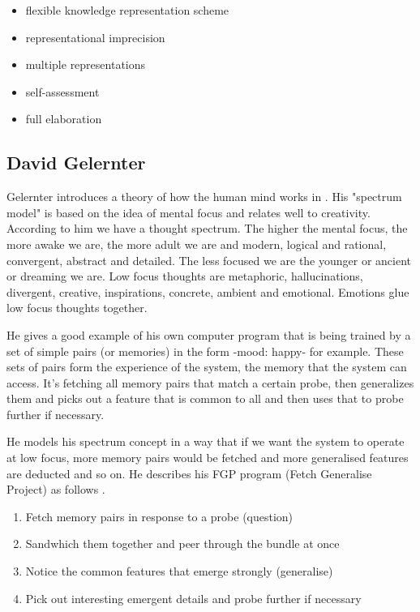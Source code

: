 \begin{itemize}
  \item flexible knowledge representation scheme
  \item representational imprecision
  \item multiple representations
  \item self-assessment
  \item full elaboration
\end{itemize}

\subsection{David Gelernter}

Gelernter introduces a theory of how the human mind works in \citep{Gelernter1994}. His "spectrum model" is based on the idea of mental focus and relates well to creativity. According to him we have a thought spectrum. The higher the mental focus, the more awake we are, the more adult we are and modern, logical and rational, convergent, abstract and detailed. The less focused we are the younger or ancient or dreaming we are. Low focus thoughts are metaphoric, hallucinations, divergent, creative, inspirations, concrete, ambient and emotional. Emotions glue low focus thoughts together.

He gives a good example of his own computer program that is being trained by a set of simple pairs (or memories) in the form -mood: happy- for example. These sets of pairs form the experience of the system, the memory that the system can access. It's fetching all memory pairs that match a certain probe, then generalizes them and picks out a feature that is common to all and then uses that to probe further if necessary.

He models his spectrum concept in a way that if we want the system to operate at low focus, more memory pairs would be fetched and more generalised features are deducted and so on. He describes his FGP program (Fetch Generalise Project) as follows \citep[p.132]{Gelernter1994}.

\begin{enumerate}
  \item Fetch memory pairs in response to a probe (question)
  \item Sandwhich them together and peer through the bundle at once
  \item Notice the common features that emerge strongly (generalise)
  \item Pick out interesting emergent details and probe further if necessary
\end{enumerate}

